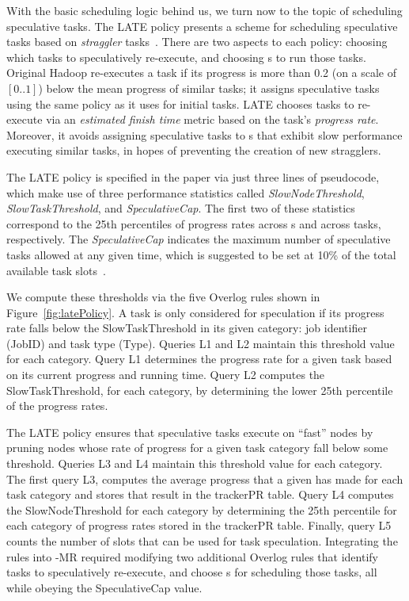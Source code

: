 With the basic scheduling logic behind us, we turn now to the topic of
scheduling speculative tasks. The LATE policy presents a scheme for 
scheduling speculative tasks based on {\em straggler} tasks~\cite{late-sched}.
There are two aspects to each policy:
choosing which tasks to speculatively re-execute, and choosing {\TT}s
to run those tasks.  Original Hadoop re-executes a task if its
progress is more than 0.2 (on a scale of $[0..1]$) below the mean
progress of similar tasks; it assigns speculative tasks using the same
policy as it uses for initial tasks. LATE chooses tasks to re-execute
via an {\em estimated finish time} metric based on the task's
\emph{progress rate}. Moreover, it avoids assigning speculative tasks
to {\TT}s that exhibit slow performance executing similar tasks, in
hopes of preventing the creation of new stragglers.

The LATE policy is specified in the paper via just three lines of pseudocode, which make use of three 
performance statistics called {\em SlowNodeThreshold}, {\em SlowTaskThreshold}, and {\em SpeculativeCap}.  
The first two of these statistics correspond to the 25th percentiles of progress rates across {\TT}s and across tasks, 
respectively.  The {\em SpeculativeCap} indicates the maximum number of speculative tasks allowed at any given 
time, which is suggested to be set at 10\% of the total available task slots~\cite{late-sched}.  

We compute these thresholds via the five Overlog rules shown in
Figure~\ref{fig:latePolicy}. A task is only considered for speculation if its progress rate falls 
below the SlowTaskThreshold in its given category: job identifier (JobID) and task type (Type).  
Queries L1 and L2 maintain this threshold value for each category. Query L1 determines the progress 
rate for a given task based on its current progress and running time. Query L2 computes the SlowTaskThreshold, 
for each category, by determining the lower 25th percentile of the progress rates. 

The LATE policy ensures that speculative tasks execute on ``fast'' nodes by pruning \TT 
nodes whose rate of progress for a given task category fall below some threshold. 
Queries L3 and L4 maintain this threshold value for each category. The first query L3, computes 
the average progress that a given \TT has made for each task category and stores that result in 
the trackerPR table. Query L4 computes the SlowNodeThreshold for each category by determining the 25th 
percentile for each category of progress rates stored in the trackerPR table. Finally, query L5 counts the number of
slots that can be used for task speculation. Integrating the rules into \BOOM-MR required modifying two 
additional Overlog rules that identify tasks to speculatively re-execute, and choose {\TT}s for scheduling those
tasks, all while obeying the SpeculativeCap value.

